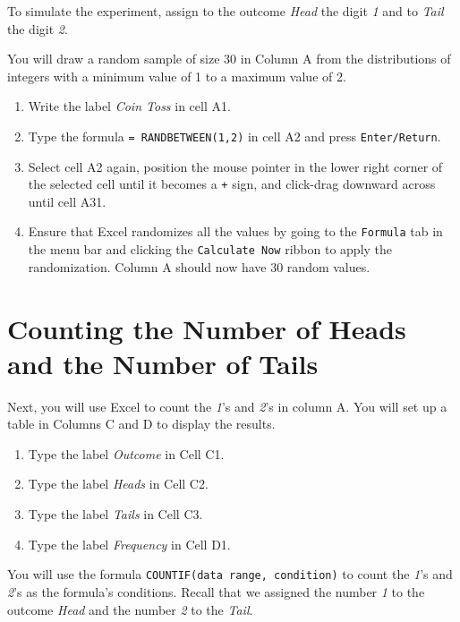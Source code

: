 \documentclass[
]{book}
\providecommand{\tightlist}{%
  \setlength{\itemsep}{0pt}\setlength{\parskip}{0pt}}
\begin{document}
To simulate the experiment, assign to the outcome \emph{Head} the digit \emph{1} and to \emph{Tail} the digit \emph{2}.

You will draw a random sample of size 30 in Column A from the distributions of integers with a minimum value of 1 to a maximum value of 2.

\begin{enumerate}
\def\labelenumi{\arabic{enumi}.}
\tightlist
\item
  Write the label \emph{Coin Toss} in cell A1.
\item
  Type the formula \texttt{=\ RANDBETWEEN(1,2)} in cell A2 and press \texttt{Enter/Return}.
\item
  Select cell A2 again, position the mouse pointer in the lower right corner of the selected cell until it becomes a \texttt{+} sign, and click-drag downward across until cell A31.
\item
  Ensure that Excel randomizes all the values by going to the \texttt{Formula} tab in the menu bar and clicking the \texttt{Calculate\ Now} ribbon to apply the randomization. Column A should now have 30 random values.
\end{enumerate}

\hypertarget{counting-the-number-of-heads-and-the-number-of-tails}{%
\section{Counting the Number of Heads and the Number of Tails}\label{counting-the-number-of-heads-and-the-number-of-tails}}

Next, you will use Excel to count the \emph{1}'s and \emph{2}'s in column A. You will set up a table in Columns C and D to display the results.

\begin{enumerate}
\def\labelenumi{\arabic{enumi}.}
\tightlist
\item
  Type the label \emph{Outcome} in Cell C1.
\item
  Type the label \emph{Heads} in Cell C2.
\item
  Type the label \emph{Tails} in Cell C3.
\item
  Type the label \emph{Frequency} in Cell D1.
\end{enumerate}

You will use the formula \texttt{COUNTIF(data\ range,\ condition)} to count the \emph{1}'s and \emph{2}'s as the formula's conditions. Recall that we assigned the number \emph{1} to the outcome \emph{Head} and the number \emph{2} to the \emph{Tail}.
\end{document}

